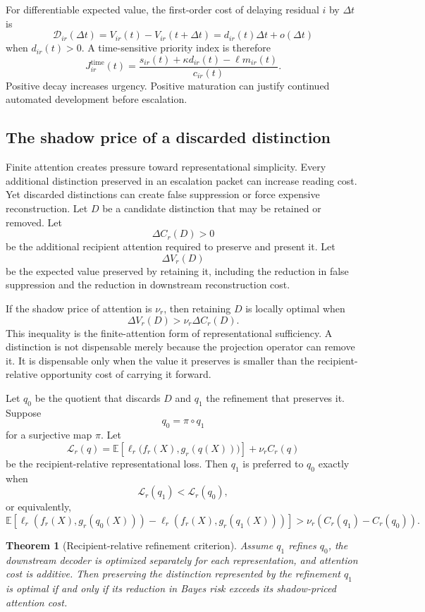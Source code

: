 \documentclass[11pt]{article}
\newtheorem{theorem}[definition]{Theorem}
\theoremstyle{definition}
\newcommand{\E}{\mathbb{E}}
\begin{document}
For differentiable expected value, the first-order cost of delaying residual \(i\) by \(\Delta t\) is
\[
\mathcal{D}_{ir}(\Delta t)
=
V_{ir}(t)-V_{ir}(t+\Delta t)
=
d_{ir}(t)\Delta t+o(\Delta t)
\]
when \(d_{ir}(t)>0\). A time-sensitive priority index is therefore
\[
J_{ir}^{\mathrm{time}}(t)
=
\frac{
s_{ir}(t)
+
\kappa d_{ir}(t)
-
\ell m_{ir}(t)
}{
c_{ir}(t)
}.
\]
Positive decay increases urgency. Positive maturation can justify continued automated development before escalation.

\subsection{The shadow price of a discarded distinction}

Finite attention creates pressure toward representational simplicity. Every additional distinction preserved in an escalation packet can increase reading cost. Yet discarded distinctions can create false suppression or force expensive reconstruction. Let \(D\) be a candidate distinction that may be retained or removed. Let
\[
\Delta C_r(D)>0
\]
be the additional recipient attention required to preserve and present it. Let
\[
\Delta V_r(D)
\]
be the expected value preserved by retaining it, including the reduction in false suppression and the reduction in downstream reconstruction cost.

If the shadow price of attention is \(\nu_r\), then retaining \(D\) is locally optimal when
\[
\Delta V_r(D)
>
\nu_r\Delta C_r(D).
\]
This inequality is the finite-attention form of representational sufficiency. A distinction is not dispensable merely because the projection operator can remove it. It is dispensable only when the value it preserves is smaller than the recipient-relative opportunity cost of carrying it forward.

Let \(q_0\) be the quotient that discards \(D\) and \(q_1\) the refinement that preserves it. Suppose
\[
q_0=\pi\circ q_1
\]
for a surjective map \(\pi\). Let
\[
\mathcal{L}_r(q)
=
\E\!\left[
\ell_r\bigl(
f_r(X),
g_r(q(X))
\bigr)
\right]
+
\nu_r C_r(q)
\]
be the recipient-relative representational loss. Then \(q_1\) is preferred to \(q_0\) exactly when
\[
\mathcal{L}_r(q_1)<\mathcal{L}_r(q_0),
\]
or equivalently,
\[
\E\!\left[
\ell_r(f_r(X),g_r(q_0(X)))
-
\ell_r(f_r(X),g_r(q_1(X)))
\right]
>
\nu_r
\left(
C_r(q_1)-C_r(q_0)
\right).
\]

\begin{theorem}[Recipient-relative refinement criterion]
Assume \(q_1\) refines \(q_0\), the downstream decoder is optimized separately for each representation, and attention cost is additive. Then preserving the distinction represented by the refinement \(q_1\) is optimal if and only if its reduction in Bayes risk exceeds its shadow-priced attention cost.
\end{theorem}
\end{document}
